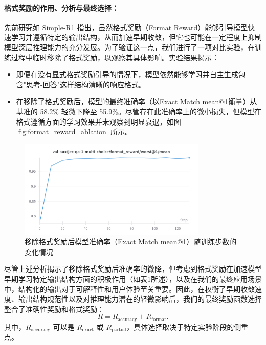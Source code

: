 \documentclass{pkuthesis}
\begin{document}
\paragraph{格式奖励的作用、分析与最终选择：}
先前研究如 Simple-R1 \cite{zeng2025simplerl} 指出，虽然格式奖励（Format Reward）能够引导模型快速学习并遵循特定的输出结构，从而加速早期收敛，但它也可能在一定程度上抑制模型深层推理能力的充分发展。为了验证这一点，我们进行了一项对比实验，在训练过程中临时移除了格式奖励，以观察其具体影响。实验结果揭示：
\begin{itemize}
    \item 即便在没有显式格式奖励引导的情况下，模型依然能够学习并自主生成包含"思考-回答"这样结构清晰的响应格式。
    \item 在移除了格式奖励后，模型的最终准确率（以Exact Match mean@1衡量）从基准的 58.2\% 轻微下降至 55.9\%。尽管存在此准确率上的微小损失，但模型在格式遵循方面的学习效果并未观察到明显衰退，如图 \ref{fig:format_reward_ablation} 所示。
\end{itemize}

\begin{figure}[h]
\centering
\includegraphics[width=0.8\textwidth]{figures/format.png}
\caption{移除格式奖励后模型准确率（Exact Match mean@1）随训练步数的变化情况}
\label{fig:format}
\end{figure}

尽管上述分析揭示了移除格式奖励后准确率的微降，但考虑到格式奖励在加速模型早期学习特定输出结构方面的积极作用（如表1所述），以及在我们的最终应用场景中，结构化的输出对于可解释性和用户体验至关重要。因此，在权衡了早期收敛速度、输出结构规范性以及对推理能力潜在的轻微影响后，我们的最终奖励函数选择整合了准确性奖励和格式奖励：
\begin{equation}
R = R_{\mathrm{accuracy}} + R_{\mathrm{format}}.
\end{equation}
其中，$R_{\mathrm{accuracy}}$ 可以是 $R_{\mathrm{exact}}$ 或 $R_{\mathrm{partial}}$，具体选择取决于特定实验阶段的侧重点。
\end{document}
